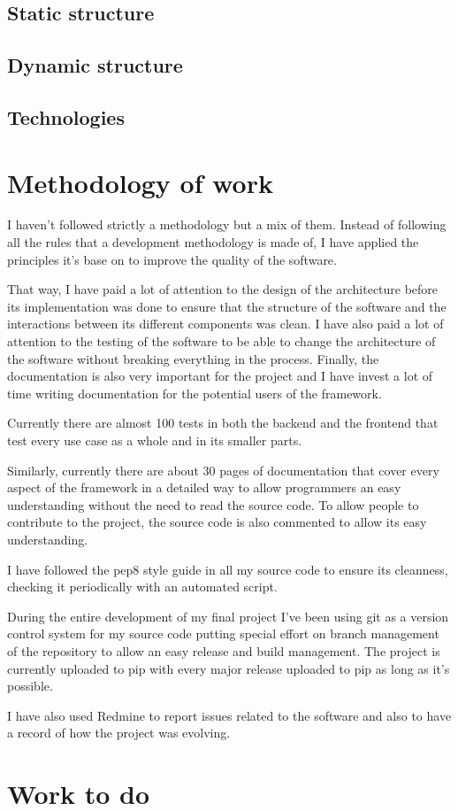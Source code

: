 \documentclass[12pt]{article}
\begin{document}
        \subsection{Static structure}
        \subsection{Dynamic structure}
        \subsection{Technologies}

    \section{Methodology of work}
        I haven't followed strictly a methodology but a mix of them. Instead of
        following all the rules that a development methodology is made of, I
        have applied the principles it's base on to improve the quality of the
        software.
        
        That way, I have paid a lot of attention to the design of the
        architecture before its implementation was done to ensure that the
        structure of the software and the interactions between its different
        components was clean. I have also paid a lot of attention to the
        testing of the software to be able to change the architecture of the
        software without breaking everything in the process. Finally, the
        documentation is also very important for the project and I have invest a
        lot of time writing documentation for the potential users of the
        framework.

        Currently there are almost 100 tests in both the backend and the
        frontend that test every use case as a whole and in its smaller parts.

        Similarly, currently there are about 30 pages of documentation that
        cover every aspect of the framework in a detailed way to allow
        programmers an easy understanding without the need to read the source
        code. To allow people to contribute to the project, the source code is
        also commented to allow its easy understanding.

        I have followed the pep8 style guide in all my source code to ensure
        its cleanness, checking it periodically with an automated script.

        During the entire development of my final project I've been using git
        as a version control system for my source code putting special effort on
        branch management of the repository to allow an easy release and build
        management. The project is currently uploaded to pip with every major
        release uploaded to pip as long as it's possible.

        I have also used Redmine to report issues related to the software and
        also to have a record of how the project was evolving.

    \section{Work to do}
\end{document}
